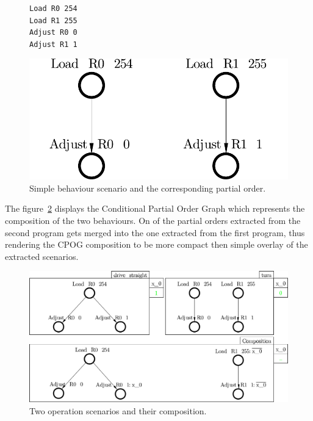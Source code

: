 \begin{figure}
\vspace{-5mm}
\centering
  \begin{minipage}[b]{0.5\textwidth}
\begin{verbatim}
Load R0 254
Load R1 255
Adjust R0 0
Adjust R1 1
\end{verbatim}
\vspace{5mm}
\end{minipage}
\begin{minipage}[b]{0.4\textwidth}
\includegraphics[scale=0.35]{img/ataed-scenario-turn.pdf}
\end{minipage}
\caption{Simple behaviour scenario and the corresponding
partial order.\label{fig-scenarios-turn}}
\end{figure}

The figure~\ref{fig-scenarios-composition} displays the Conditional Partial Order Graph
which represents the composition of the two behaviours. On of the partial orders
extracted from the second program gets merged into the one extracted from the first
program, thus rendering the CPOG composition to be more compact then simple overlay of
the extracted scenarios.

\begin{figure}
\centerline{\includegraphics[scale=0.35]{img/ataed-composition.pdf}}
\caption{Two operation scenarios and their composition.\label{fig-scenarios-composition}}
\end{figure}

